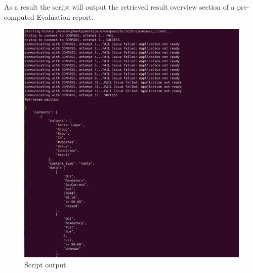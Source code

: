 As a result the script will output the retrieved result overview section of a pre-computed Evaluation report.

\begin{figure}[H]
    \hspace*{-2.5cm}
    \includegraphics[width=18cm,frame]{figures/script_result.png}
  \caption{Script output}
\end{figure}
